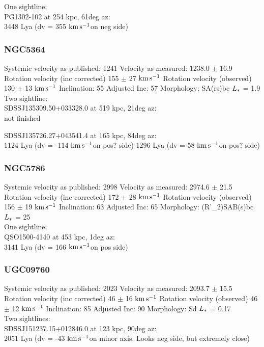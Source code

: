 \documentclass[iop]{emulateapj-rtx4}
\newcommand{\kms}{$\rm km\, s^{-1}$}
\begin{document}
One sightline: \\
PG1302-102 at 254 kpc, 61deg az: \\
3448 Lya (dv = 355 \kms on neg side)



\subsubsection{NGC5364}
Systemic velocity as published: 1241
Velocity as measured: 1238.0 $\pm$ 16.9
Rotation velocity (inc corrected) 155 $\pm$ 27 \kms
Rotation velocity (observed) 130 $\pm$ 13 \kms
Inclination: 55
Adjusted Inc: 57
Morphology: SA(rs)bc
$L_{\**}$ = 1.9 \\

Two sightline: \\
SDSSJ135309.50+033328.0 at 519 kpc, 21deg az: \\
not finished

SDSSJ135726.27+043541.4 at 165 kpc, 84deg az: \\
1124 Lya (dv = -114 \kms on pos? side)
1296 Lya (dv = 58 \kms on pos? side)



\subsubsection{NGC5786}
Systemic velocity as published: 2998
Velocity as measured: 2974.6 $\pm$ 21.5
Rotation velocity (inc corrected) 172 $\pm$ 28 \kms
Rotation velocity (observed) 156 $\pm$ 19 \kms
Inclination: 63
Adjusted Inc: 65
Morphology: (R'\_2)SAB(s)bc
$L_{\**}$ = 25 \\

One sightline: \\
QSO1500-4140 at 453 kpc, 1deg az: \\
3141 Lya (dv = 166 \kms on pos side)


\subsubsection{UGC09760}
Systemic velocity as published: 2023
Velocity as measured: 2093.7 $\pm$ 15.5
Rotation velocity (inc corrected) 46 $\pm$ 16 \kms
Rotation velocity (observed) 46 $\pm$ 12 \kms
Inclination: 85
Adjusted Inc: 90
Morphology: Sd
$L_{\**}$ = 0.17 \\

Two sightlines: \\
SDSSJ151237.15+012846.0 at 123 kpc, 90deg az: \\
2051 Lya (dv = -43 \kms on minor axis. Looks neg side, but extremely close)
\end{document}

